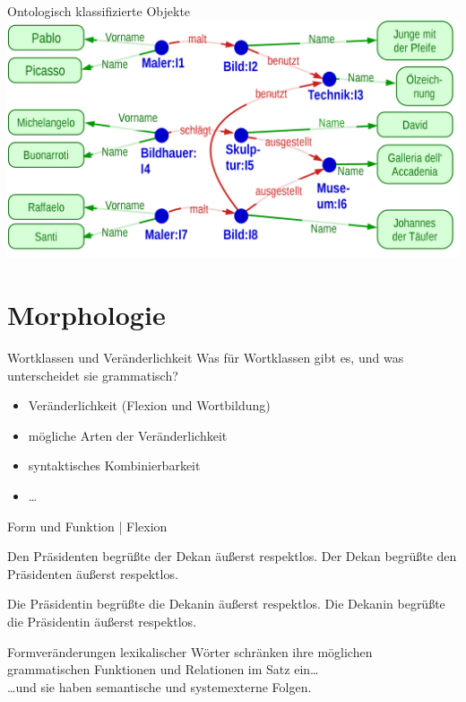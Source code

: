 \begin{frame}
  {Ontologisch klassifizierte Objekte}
  \onslide<+->
  \centering
  \includegraphics[height=0.7\textheight]{graphics/onto_tok}\\
  \Viertelzeile
\end{frame}

\section{Morphologie}

\begin{frame}
  {Wortklassen und Veränderlichkeit}
  \onslide<+->
  Was für Wortklassen gibt es, und was unterscheidet sie \alert{grammatisch}?\\
  \onslide<+->
  \Zeile
  \begin{itemize}[<+->]
    \item Veränderlichkeit (Flexion und Wortbildung)
    \item mögliche Arten der Veränderlichkeit
    \item syntaktisches Kombinierbarkeit
    \item \ldots
  \end{itemize}
\end{frame}

\begin{frame}
  {Form und Funktion | Flexion}
  \pause
  \begin{exe}
    \ex
    \begin{xlist}
      \ex \alert{Den Präsidenten} begrüßte \alert{der Dekan} äußerst respektlos.
      \pause
      \ex \alert{Der Dekan} begrüßte \alert{den Präsidenten} äußerst respektlos.
    \end{xlist}
    \pause
    \ex
    \begin{xlist}
      \ex \alert{Die Präsidentin} begrüßte \alert{die Dekanin} äußerst respektlos.
      \pause
      \ex \alert{Die Dekanin} begrüßte \alert{die Präsidentin} äußerst respektlos.
    \end{xlist}
  \end{exe}
  \pause
  \Zeile
  Formveränderungen lexikalischer Wörter \alert{schränken ihre möglichen grammatischen Funktionen und Relationen im Satz ein}\dots\\
  \pause
  \Halbzeile
  \dots und sie haben semantische und systemexterne Folgen.
\end{frame}

